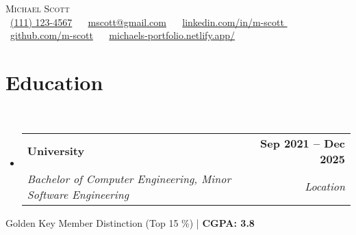 \documentclass[letterpaper,11pt]{article}
\makeatletter
\newcommand{\resumeSubheading}[4]{
  \vspace{-2pt}\item
    \begin{tabular*}{1.0\textwidth}[t]{l@{\extracolsep{\fill}}r}
      \textbf{#1} & \textbf{\small #2} \\
      \textit{\small#3} & \textit{\small #4} \\
    \end{tabular*}\vspace{-7pt}
}
\newcommand{\resumeSubHeadingListStart}{\begin{itemize}[leftmargin=0.0in, label={}]}
\newcommand{\resumeSubHeadingListEnd}{\end{itemize}\vspace{0pt}}
\makeatother
\begin{document}
\begin{center}
    {\Large \scshape Michael Scott} \\[2mm]
    \footnotesize \raisebox{-0.1\height}
    \faPhone\ \underline{(111) 123-4567} ~ 
    {\faEnvelope\  \underline{mscott@gmail.com}} ~ 
    {\faLinkedin\ \underline{linkedin.com/in/m-scott }}  ~
    {\faGithub\ \underline{github.com/m-scott}} ~
    {\faBriefcase\ \underline{michaels-portfolio.netlify.app/}}
    \vspace{-8pt}
\end{center}

\section{Education} \\[2mm]
  \resumeSubHeadingListStart
    \resumeSubheading
      {University}{Sep 2021 -- Dec 2025}
      {Bachelor of Computer Engineering, Minor Software Engineering
      }{Location}
  \resumeSubHeadingListEnd
    {Golden Key Member Distinction (Top 15 \%) | \textbf{CGPA: 3.8}}
    \vspace{-5pt}

\end{document}
